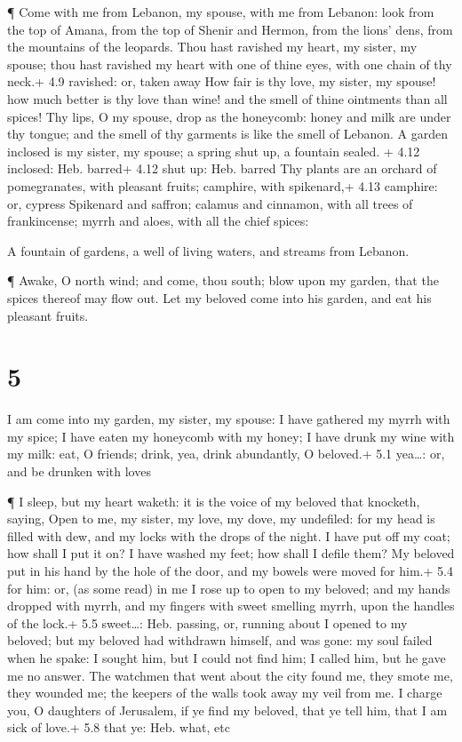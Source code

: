  ¶ Come with me from Lebanon, my spouse, with me from
Lebanon: look from the top of Amana, from the top of Shenir and Hermon,
from the lions' dens, from the mountains of the leopards. 
Thou hast ravished my heart, my sister, my spouse; thou hast ravished my
heart with one of thine eyes, with one chain of thy neck.+ 4.9 ravished:
or, taken away  How fair is thy love, my sister, my spouse!
how much better is thy love than wine! and the smell of thine ointments
than all spices!  Thy lips, O my spouse, drop as the
honeycomb: honey and milk are under thy tongue; and the smell of thy
garments is like the smell of Lebanon.  A garden inclosed
is my sister, my spouse; a spring shut up, a fountain sealed. + 4.12
inclosed: Heb. barred+ 4.12 shut up: Heb. barred  Thy
plants are an orchard of pomegranates, with pleasant fruits; camphire,
with spikenard,+ 4.13 camphire: or, cypress  Spikenard and
saffron; calamus and cinnamon, with all trees of frankincense; myrrh and
aloes, with all the chief spices:

 A fountain of gardens, a well of living waters, and
streams from Lebanon.

 ¶ Awake, O north wind; and come, thou south; blow upon my
garden, that the spices thereof may flow out. Let my beloved come into
his garden, and eat his pleasant fruits.

\hypertarget{section-4}{%
\section{5}\label{section-4}}

 I am come into my garden, my sister, my spouse: I have
gathered my myrrh with my spice; I have eaten my honeycomb with my
honey; I have drunk my wine with my milk: eat, O friends; drink, yea,
drink abundantly, O beloved.+ 5.1 yea\ldots: or, and be drunken with
loves

 ¶ I sleep, but my heart waketh: it is the voice of my
beloved that knocketh, saying, Open to me, my sister, my love, my dove,
my undefiled: for my head is filled with dew, and my locks with the
drops of the night.  I have put off my coat; how shall I put
it on? I have washed my feet; how shall I defile them?  My
beloved put in his hand by the hole of the door, and my bowels were
moved for him.+ 5.4 for him: or, (as some read) in me  I
rose up to open to my beloved; and my hands dropped with myrrh, and my
fingers with sweet smelling myrrh, upon the handles of the lock.+ 5.5
sweet\ldots: Heb. passing, or, running about  I opened to my
beloved; but my beloved had withdrawn himself, and was gone: my soul
failed when he spake: I sought him, but I could not find him; I called
him, but he gave me no answer.  The watchmen that went about
the city found me, they smote me, they wounded me; the keepers of the
walls took away my veil from me.  I charge you, O daughters
of Jerusalem, if ye find my beloved, that ye tell him, that I am sick of
love.+ 5.8 that ye: Heb. what, etc


